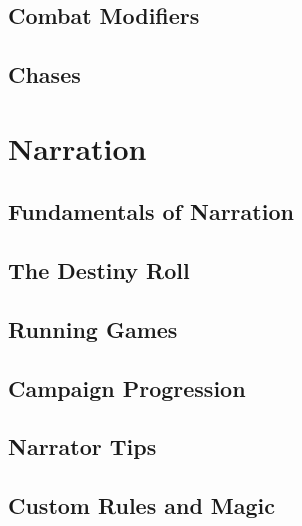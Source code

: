 \newpage
\chapter{Combat Modifiers} \label{ch:cb.combat_modifiers}


\newpage
\chapter{Chases} \label{ch:cb.chases}


\cleardoublepage
\part{Narration} \label{part:narration}

\newpage
\chapter{Fundamentals of Narration} \label{ch:na.fundamentals}


\newpage
\chapter{The Destiny Roll} \label{ch:na.the_destiny_roll}


\newpage
\chapter{Running Games} \label{ch:na.running_games}


\newpage
\chapter{Campaign Progression} \label{ch:na.campaign_progression}


\newpage
\chapter{Narrator Tips} \label{ch:na.narrator_tips}


\newpage
\chapter{Custom Rules and Magic} \label{ch:na.custom_rules_and_magic}


